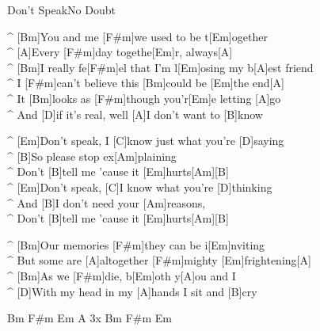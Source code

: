 \begin{song}{Don't Speak}{No Doubt}

\begin{guitar}
^ [Bm]You and me [F#m]we used to be t[Em]ogether\\
^ [A]Every [F#m]day togethe[Em]r, always[A]\\
^ [Bm]I really fe[F#m]el that I'm l[Em]osing my b[A]est friend\\
^ I [F#m]can't believe this [Bm]could be [Em]the end[A]\\
^ It [Bm]looks as [F#m]though you'r[Em]e letting [A]go\\
^ And [D]if it's real, well [A]I don't want to [B]know\\
\end{guitar}

\begin{guitar}
^ [Em]Don't speak, I [C]know just what you're [D]saying\\
^ [B]So please stop ex[Am]plaining\\
^ Don't [B]tell me 'cause it [Em]hurts[Am][B]\\
^ [Em]Don't speak, [C]I know what you're [D]thinking\\
^ And [B]I don't need your [Am]reasons,\\
^ Don't [B]tell me 'cause it [Em]hurts[Am][B]\\
\end{guitar}


\begin{guitar}
^ [Bm]Our memories [F#m]they can be i[Em]nviting\\
^ But some are [A]altogether [F#m]mighty [Em]frightening[A]\\
^ [Bm]As we [F#m]die, b[Em]oth y[A]ou and I\\
^ [D]With my head in my [A]hands I sit and [B]cry\\
\end{guitar}


\begin{guitar}
Bm F#m Em A 3x  Bm F#m Em\\
\end{guitar}



\end{song}
